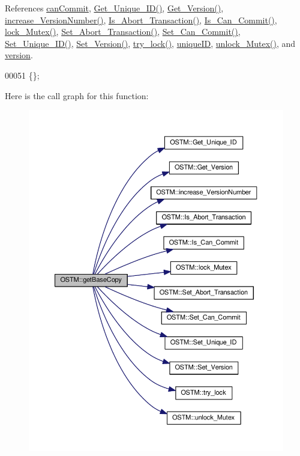 References \hyperlink{_o_s_t_m_8h_source_l00121}{can\+Commit}, \hyperlink{_o_s_t_m_8cpp_source_l00082}{Get\+\_\+\+Unique\+\_\+\+I\+D()}, \hyperlink{_o_s_t_m_8cpp_source_l00100}{Get\+\_\+\+Version()}, \hyperlink{_o_s_t_m_8cpp_source_l00108}{increase\+\_\+\+Version\+Number()}, \hyperlink{_o_s_t_m_8cpp_source_l00140}{Is\+\_\+\+Abort\+\_\+\+Transaction()}, \hyperlink{_o_s_t_m_8cpp_source_l00124}{Is\+\_\+\+Can\+\_\+\+Commit()}, \hyperlink{_o_s_t_m_8cpp_source_l00147}{lock\+\_\+\+Mutex()}, \hyperlink{_o_s_t_m_8cpp_source_l00132}{Set\+\_\+\+Abort\+\_\+\+Transaction()}, \hyperlink{_o_s_t_m_8cpp_source_l00117}{Set\+\_\+\+Can\+\_\+\+Commit()}, \hyperlink{_o_s_t_m_8cpp_source_l00075}{Set\+\_\+\+Unique\+\_\+\+I\+D()}, \hyperlink{_o_s_t_m_8cpp_source_l00092}{Set\+\_\+\+Version()}, \hyperlink{_o_s_t_m_8cpp_source_l00162}{try\+\_\+lock()}, \hyperlink{_o_s_t_m_8h_source_l00117}{unique\+ID}, \hyperlink{_o_s_t_m_8cpp_source_l00154}{unlock\+\_\+\+Mutex()}, and \hyperlink{_o_s_t_m_8h_source_l00111}{version}.


\begin{DoxyCode}
00051 \{\};
\end{DoxyCode}


Here is the call graph for this function\+:\nopagebreak
\begin{figure}[H]
\begin{center}
\leavevmode
\includegraphics[width=350pt]{class_o_s_t_m_a0bfa3763bd441407dd6365f42714f94c_a0bfa3763bd441407dd6365f42714f94c_cgraph}
\end{center}
\end{figure}


